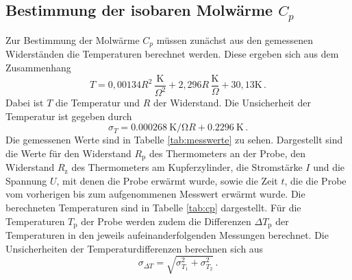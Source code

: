\subsection{Bestimmung der isobaren Molwärme $C_p$}
\label{subsec:cp}
Zur Bestimmung der Molwärme $C_p$ müssen zunächst aus den gemessenen
Widerständen die Temperaturen berechnet werden. Diese ergeben sich aus dem
Zusammenhang
\begin{equation*}
  T=0,00134R^2\,\frac{\text{K}}{\Omega^2}+2,296R\,\frac{\text{K}}{\Omega}+30,13\text{K} \,.
\end{equation*}
Dabei ist $T$ die Temperatur und $R$ der Widerstand. Die Unsicherheit der Temperatur ist gegeben durch
\begin{equation*}
  \sigma_T = \SI{0.000268}{\kelvin\per\ohm} R + \SI{0.2296}{\kelvin}\,.
\end{equation*}
Die gemessenen Werte sind in Tabelle \ref{tab:messwerte} zu sehen.
Dargestellt sind die Werte für den Widerstand $R_\text{p}$ des Thermometers an der Probe,
den Widerstand $R_\text{z}$ des Thermometers am Kupferzylinder, die Stromstärke $I$ und
die Spannung $U$, mit denen die Probe erwärmt wurde, sowie die Zeit $t$,
die die Probe vom vorherigen bis zum aufgenommenen Messwert erwärmt wurde.
Die berechneten Temperaturen sind in Tabelle \ref{tab:cp} dargestellt. Für die
Temperaturen $T_\text{p}$ der Probe werden zudem die Differenzen $\Delta T_\text{p}$ der Temperaturen
in den jeweils aufeinanderfolgenden Messungen berechnet. Die Unsicherheiten der Temperaturdifferenzen berechnen sich aus
\begin{equation*}
  \sigma_{\Delta T} = \sqrt{\sigma_{T_1}^2+\sigma_{T_2}^2}\,.
\end{equation*}

